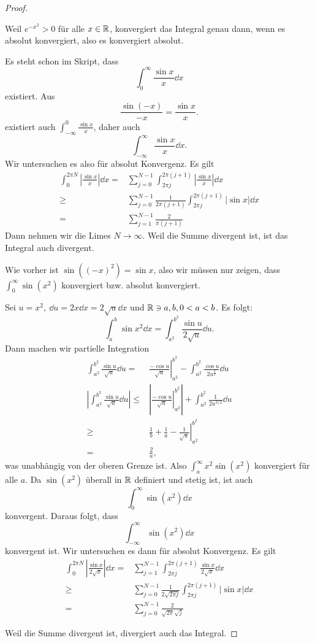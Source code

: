 \begin{proof}
\begin{parts}
		Weil $e^{-x^2}>0$ f\"{u}r alle $x\in \mathbb{R}$, konvergiert das Integral genau dann, wenn es absolut konvergiert, also es konvergiert absolut.
	\item Es steht schon im Skript, dass
		\[
			\int_0^\infty \frac{\sin x}{x}\dd{x}
		\]
		existiert. Aus
		\[
			\frac{\sin(-x)}{-x}=\frac{\sin x}{x}
		.\] 
		existiert auch $\int_{-\infty}^0 \frac{\sin x}{x}$, daher auch
		\[
			\int_{-\infty}^\infty \frac{\sin x}{x}\dd{x}
		.\] 
		Wir untersuchen es also f\"{u}r absolut Konvergenz. Es gilt
		\begin{align*}
			\int_0^{2\pi N}\left|\frac{\sin x}{x}\right|\dd{x}=&\sum_{j=0}^{N-1}\int_{2\pi j}^{2\pi(j+1)}\left|\frac{\sin x}{x}\right|\dd{x}\\
			\ge&\sum_{j=0}^{N-1}\frac{1}{2\pi (j+1)}\int_{2\pi j}^{2\pi(j+1)}|\sin x|\dd{x}\\
			=&\sum_{j=1}^{N-1}\frac{2}{\pi(j+1)}
		\end{align*}
		Dann nehmen wir die Limes $N\to \infty$. Weil die Summe divergent ist, ist das Integral auch divergent.
	\item Wie vorher ist $\sin((-x)^2)=\sin x$, also wir müssen nur zeigen, dass $\int_0^\infty \sin(x^2)$ konvergiert bzw. absolut konvergiert.

		Sei $u=x^2,~\dd{u}=2x\dd{x}=2\sqrt{u} \dd{x}$ und $\mathbb{R}\ni a,b, 0<a<b$. Es folgt:
		\[
			\int_a^b \sin x^2\dd{x}=\int_{a^2}^{b^2} \frac{\sin u}{2\sqrt{u} }\dd{u} 
		.\] 
		Dann machen wir partielle Integration
		\begin{align*}
			\int_{a^2}^{b^2}\frac{\sin u}{\sqrt{u} }\dd{u}=&\left.\frac{-\cos u}{\sqrt{u} }\right|_{a^2}^{b^2}-\int_{a^2}^{b^2}\frac{\cos u}{2u^{\frac{3}{2}}}\dd{u}\\
				\left| \int_{a^2}^{b^2}\frac{\sin u}{\sqrt{u} }\dd{u} \right|\le&\left| \left.\frac{-\cos u}{\sqrt{u} }\right|_{a^2}^{b^2} \right|+\int_{a^2}^{b^2} \frac{1}{2u^{3 / 2}}\dd{u}\\
					\ge& \frac{1}{b}+\frac{1}{a}-\left. \frac{1}{\sqrt{u} }\right|_{a^2}^{b^2}\\
						=& \frac{2}{a},
		\end{align*}
		was unabhängig von der oberen Grenze ist. Also $\int_a^\infty x^2 \sin(x^2)	$ konvergiert f\"{u}r alle $a$. Da $\sin(x^2)$ überall in $\mathbb{R}$ definiert und stetig ist, ist auch
		\[
			\int_0^\infty \sin(x^2)\dd{x}
		\]
		konvergent. Daraus folgt, dass
		\[
			\int_{-\infty}^\infty\sin(x^2)\dd{x}
		\]
		konvergent ist. Wir untersuchen es dann f\"{u}r absolut Konvergenz. Es gilt
		\begin{align*}
			\int_0^{2\pi N}\left| \frac{\sin x}{2\sqrt{x} } \right| \dd{x}=&\sum_{j=1}^{N-1}\int_{2\pi j}^{2\pi (j+1)}\frac{\sin x}{2\sqrt{x} }\dd{x}\\
			\ge&\sum_{j=0}^{N-1}\frac{1}{2\sqrt{2\pi j} }\int_{2\pi j}^{2\pi (j+1)}|\sin x|\dd{x}\\
			=&\sum_{j=0}^{N-1}\frac{2}{\sqrt{2\pi} \sqrt{j} }
		\end{align*}
	\end{parts}
	Weil die Summe divergent ist, divergiert auch das Integral.
\end{proof}
